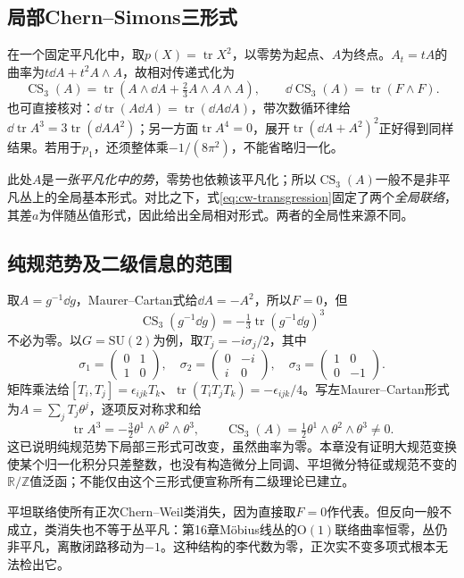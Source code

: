 \subsection{局部Chern--Simons三形式}
在一个固定平凡化中，取$p(X)=\operatorname{tr}X^2$，以零势为起点、$A$为终点。$A_t=tA$的曲率为$t\dd A+t^2A\wedge A$，故相对传递式化为
\begin{equation}\label{eq:cs-three}
 \operatorname{CS}_3(A)=\operatorname{tr}
 \left(A\wedge\dd A+\tfrac23A\wedge A\wedge A\right),
 \qquad \dd\operatorname{CS}_3(A)=\operatorname{tr}(F\wedge F).
\end{equation}
也可直接核对：$\dd\operatorname{tr}(A\dd A)=\operatorname{tr}(\dd A\dd A)$，带次数循环律给$\dd\operatorname{tr}A^3=3\operatorname{tr}(\dd A A^2)$；另一方面$\operatorname{tr}A^4=0$，展开$\operatorname{tr}(\dd A+A^2)^2$正好得到同样结果。若用于$p_1$，还须整体乘$-1/(8\pi^2)$，不能省略归一化。

此处$A$是\emph{一张平凡化中的势}，零势也依赖该平凡化；所以$\operatorname{CS}_3(A)$一般不是非平凡丛上的全局基本形式。对比之下，式\eqref{eq:cw-transgression}固定了两个\emph{全局联络}，其差$a$为伴随丛值形式，因此给出全局相对形式。两者的全局性来源不同。

\subsection{纯规范势及二级信息的范围}
取$A=g^{-1}\dd g$，Maurer--Cartan式给$\dd A=-A^2$，所以$F=0$，但
\[
 \operatorname{CS}_3(g^{-1}\dd g)=-\tfrac13\operatorname{tr}(g^{-1}\dd g)^3
\]
不必为零。以$G=\mathrm{SU}(2)$为例，取$T_j=-i\sigma_j/2$，其中
\[
 \sigma_1=\begin{pmatrix}0&1\\1&0\end{pmatrix},\quad
 \sigma_2=\begin{pmatrix}0&-i\\i&0\end{pmatrix},\quad
 \sigma_3=\begin{pmatrix}1&0\\0&-1\end{pmatrix}.
\]
矩阵乘法给$[T_i,T_j]=\epsilon_{ijk}T_k$、$\operatorname{tr}(T_iT_jT_k)=-\epsilon_{ijk}/4$。写左Maurer--Cartan形式为$A=\sum_jT_j\theta^j$，逐项反对称求和给
\[
 \operatorname{tr}A^3=-\tfrac32\theta^1\wedge\theta^2\wedge\theta^3,
 \qquad \operatorname{CS}_3(A)=\tfrac12\theta^1\wedge\theta^2\wedge\theta^3\ne0.
\]
这已说明纯规范势下局部三形式可改变，虽然曲率为零。本章没有证明大规范变换使某个归一化积分只差整数，也没有构造微分上同调、平坦微分特征或规范不变的$\mathbb R/\mathbb Z$值泛函；不能仅由这个三形式便宣称所有二级理论已建立。

平坦联络使所有正次Chern--Weil类消失，因为直接取$F=0$作代表。但反向一般不成立，类消失也不等于丛平凡：第16章M\"obius线丛的$\mathrm O(1)$联络曲率恒零，丛仍非平凡，离散闭路移动为$-1$。这种结构的李代数为零，正次实不变多项式根本无法检出它。
